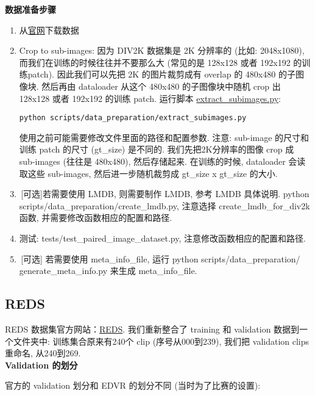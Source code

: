 \documentclass[../main.tex]{subfiles}
\begin{document}
\noindent\textbf{数据准备步骤}
\begin{enumerate}
    \item 从\href{https://data.vision.ee.ethz.ch/cvl/DIV2K}{官网}下载数据
    \item Crop to sub-images: 因为 DIV2K 数据集是 2K 分辨率的 (比如: 2048x1080), 而我们在训练的时候往往并不要那么大 (常见的是 128x128 或者 192x192 的训练patch). 因此我们可以先把 2K 的图片裁剪成有 overlap 的 480x480 的子图像块. 然后再由 dataloader 从这个 480x480 的子图像块中随机 crop 出 128x128 或者 192x192 的训练 patch.
          运行脚本 \href{https://github.com/XPixelGroup/BasicSR/blob/master/scripts/data_preparation/extract_subimages.py}{extract\_subimages.py}:
          \begin{verbatim}
python scripts/data_preparation/extract_subimages.py
\end{verbatim}
          使用之前可能需要修改文件里面的路径和配置参数. 注意: sub-image 的尺寸和训练 patch 的尺寸 (gt\_size) 是不同的. 我们先把2K分辨率的图像 crop 成 sub-images (往往是 480x480), 然后存储起来. 在训练的时候, dataloader 会读取这些 sub-images, 然后进一步随机裁剪成 gt\_size x gt\_size 的大小.
    \item\,[可选]若需要使用 LMDB, 则需要制作 LMDB, 参考 LMDB 具体说明. python scripts/data\_preparation/create\_lmdb.py, 注意选择 create\_lmdb\_for\_div2k 函数, 并需要修改函数相应的配置和路径.
    \item 测试: tests/test\_paired\_image\_dataset.py, 注意修改函数相应的配置和路径.
    \item\,[可选] 若需要使用 meta\_info\_file,
          运行 python scripts/data\_preparation/\\generate\_meta\_info.py 来生成 meta\_info\_file.
\end{enumerate}

\subsection{REDS}

REDS 数据集官方网站：\href{https://seungjunnah.github.io/Datasets/reds.html}{REDS}.
我们重新整合了 training 和 validation 数据到一个文件夹中: 训练集合原来有240个 clip (序号从000到239), 我们把 validation clips 重命名, 从240到269.\\

\noindent\textbf{Validation 的划分}

官方的 validation 划分和 EDVR 的划分不同 (当时为了比赛的设置):
\end{document}
